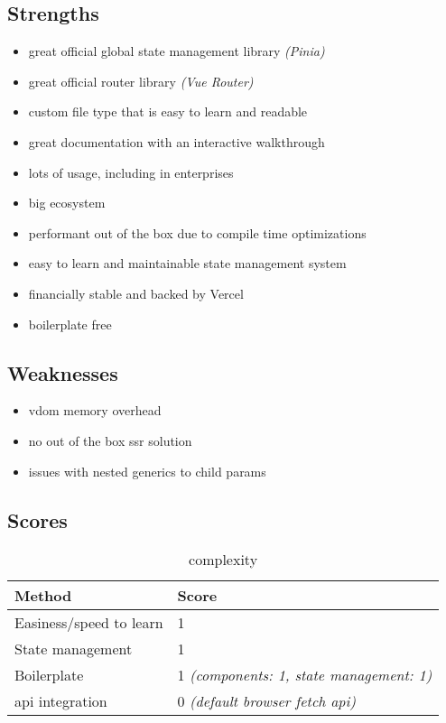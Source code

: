 \subsection{Strengths}
\label{subsec:vue:strengths}
\begin{itemize}
    \item great official global state management library \textit{(Pinia)}
    \item great official router library \textit{(Vue Router)}
    \item custom file type that is easy to learn and readable
    \item great documentation with an interactive walkthrough
    \item lots of usage, including in enterprises
    \item big ecosystem
    \item performant out of the box due to compile time optimizations
    \item easy to learn and maintainable state management system
    \item financially stable and backed by Vercel
    \item boilerplate free
\end{itemize}

\subsection{Weaknesses}
\label{subsec:vue:weaknesses}
\begin{itemize}
    \item \acrshort{vdom} memory overhead
    \item no out of the box \acrshort{ssr} solution
    \item issues with nested generics to child params
\end{itemize}


\subsection{Scores}
\label{subsec:vue:scores}

\begin{table}[H]
    \centering
    \begin{tabular}{|l|l|}
        \hline
        \textbf{Method}            & \textbf{Score}                                    \\
        \hline
        Easiness/speed to learn    & 1                                                 \\ \hline
        State management           & 1                                                 \\ \hline
        Boilerplate                & 1 \textit{(components: 1, state management: 1)}   \\ \hline
        \acrshort{api} integration & 0 \textit{(default browser fetch \acrshort{api})} \\ \hline
    \end{tabular}
    \caption{complexity}
    \label{tab:vue:complexity}
\end{table}

